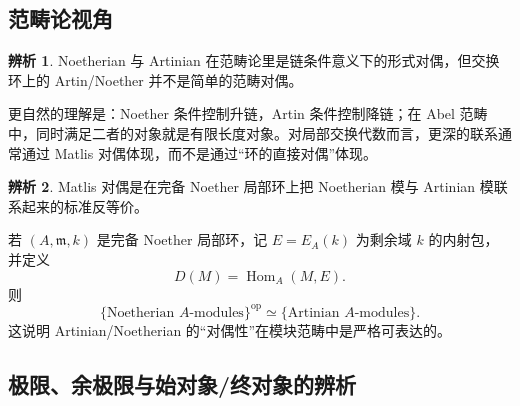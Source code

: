 \documentclass[a4paper]{ctexart}
\theoremstyle{definition}
\theoremstyle{analysis}
\newtheorem{remark}{辨析}[section]
\theoremstyle{plain}
\begin{document}
\subsection{范畴论视角}\label{subsec:categorical-view}

\begin{remark}
Noetherian 与 Artinian 在范畴论里是链条件意义下的形式对偶，但交换环上的 Artin/Noether 并不是简单的范畴对偶。

更自然的理解是：Noether 条件控制升链，Artin 条件控制降链；在 Abel 范畴中，同时满足二者的对象就是有限长度对象。对局部交换代数而言，更深的联系通常通过 Matlis 对偶体现，而不是通过“环的直接对偶”体现。
\end{remark}

\begin{remark}
Matlis 对偶是在完备 Noether 局部环上把 Noetherian 模与 Artinian 模联系起来的标准反等价。

若 \((A,\mathfrak m,k)\) 是完备 Noether 局部环，记 \(E=E_A(k)\) 为剩余域 \(k\) 的内射包，并定义
\[
  D(M)=\operatorname{Hom}_A(M,E).
\]
则
\[
  \{\text{Noetherian } A\text{-modules}\}^{\operatorname{op}}
  \simeq
  \{\text{Artinian } A\text{-modules}\}.
\]
这说明 Artinian/Noetherian 的“对偶性”在模块范畴中是严格可表达的。
\end{remark}

\subsection{极限、余极限与始对象/终对象的辨析}\label{subsec:limits-colimits}
\end{document}
